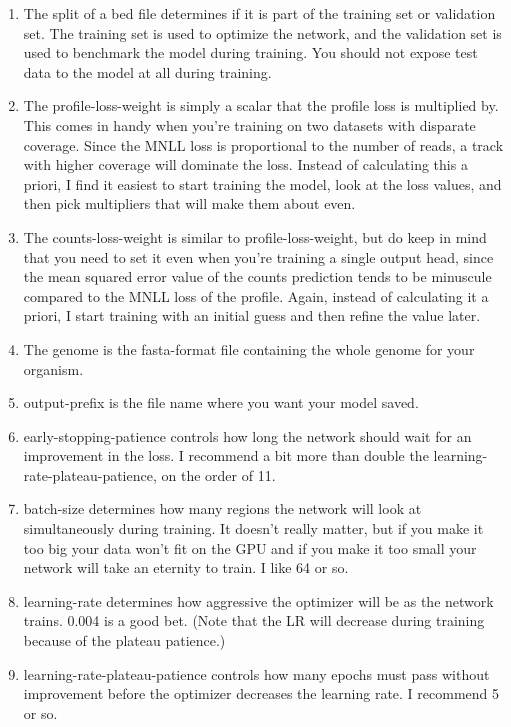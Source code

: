 \documentclass{article}
\begin{document}
\begin{enumerate}
    \item The split of a bed file determines if it is part of the training set or validation set. The training set is used to optimize the network, and the validation set is used to benchmark the model during training. You should not expose test data to the model at all during training. 
    \item The profile-loss-weight is simply a scalar that the profile loss is multiplied by. This comes in handy when you're training on two datasets with disparate coverage. Since the MNLL loss is proportional to the number of reads, a track with higher coverage will dominate the loss. Instead of calculating this a priori, I find it easiest to start training the model, look at the loss values, and then pick multipliers that will make them about even. 
    \item The counts-loss-weight is similar to profile-loss-weight, but do keep in mind that you need to set it even when you're training a single output head, since the mean squared error value of the counts prediction tends to be minuscule compared to the MNLL loss of the profile. Again, instead of calculating it a priori, I start training with an initial guess and then refine the value later. 
    \item The genome is the fasta-format file containing the whole genome for your organism. 
    \item output-prefix is the file name where you want your model saved. 
    \item early-stopping-patience controls how long the network should wait for an improvement in the loss. I recommend a bit more than double the learning-rate-plateau-patience, on the order of 11. 
    \item batch-size determines how many regions the network will look at simultaneously during training. It doesn't really matter, but if you make it too big your data won't fit on the GPU and if you make it too small your network will take an eternity to train. I like 64 or so. 
    \item learning-rate determines how aggressive the optimizer will be as the network trains. 0.004 is a good bet. (Note that the LR will decrease during training because of the plateau patience.)
    \item learning-rate-plateau-patience controls how many epochs must pass without improvement before the optimizer decreases the learning rate. I recommend 5 or so. 


\end{enumerate}
\end{document}
